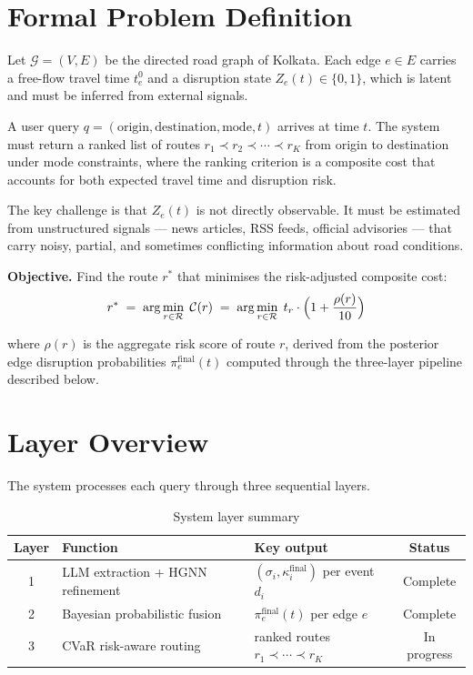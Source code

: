 \section{Formal Problem Definition}

Let $\mathcal{G} = (V, E)$ be the directed road graph of Kolkata.
Each edge $e \in E$ carries a free-flow travel time $t_e^0$ and a
disruption state $Z_e(t) \in \{0, 1\}$, which is latent and
must be inferred from external signals.

\medskip
\noindent
A user query $q = (\text{origin}, \text{destination}, \text{mode}, t)$
arrives at time $t$. The system must return a ranked list of routes
$r_1 \prec r_2 \prec \cdots \prec r_K$ from origin to destination
under mode constraints, where the ranking criterion is a composite
cost that accounts for both expected travel time and disruption risk.

\medskip
\noindent
The key challenge is that $Z_e(t)$ is not directly observable.
It must be estimated from unstructured signals — news articles,
RSS feeds, official advisories — that carry noisy, partial, and
sometimes conflicting information about road conditions.

\medskip
\noindent
\textbf{Objective.} Find the route $r^*$ that minimises the
risk-adjusted composite cost:
\begin{equation}
  r^* \;=\; \arg\min_{r \in \mathcal{R}}\; \mathcal{C}(r)
  \;=\; \arg\min_{r \in \mathcal{R}}\;
        t_r \cdot \Bigl(1 + \frac{\rho(r)}{10}\Bigr)
  \label{eq:objective}
\end{equation}

where $\rho(r)$ is the aggregate risk score of route $r$, derived from
the posterior edge disruption probabilities $\pi_e^{\text{final}}(t)$
computed through the three-layer pipeline described below.

\section{Layer Overview}

The system processes each query through three sequential layers.

\begin{table}[H]
\centering
\caption{System layer summary}
\begin{tabular}{clp{5cm}c}
\toprule
\textbf{Layer} & \textbf{Function} & \textbf{Key output} & \textbf{Status} \\
\midrule
1 & LLM extraction + HGNN refinement
  & $(\sigma_i, \kappa_i^{\text{final}})$ per event $d_i$
  & Complete \\
2 & Bayesian probabilistic fusion
  & $\pi_e^{\text{final}}(t)$ per edge $e$
  & Complete \\
3 & CVaR risk-aware routing
  & ranked routes $r_1 \prec \cdots \prec r_K$
  & In progress \\
\bottomrule
\end{tabular}
\end{table}

